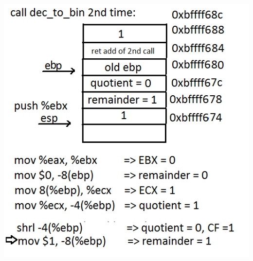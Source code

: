 \documentclass{article}
\begin{document}
\includegraphics[scale=0.5]{stack6.png}\\ \\ 
\end{document}
